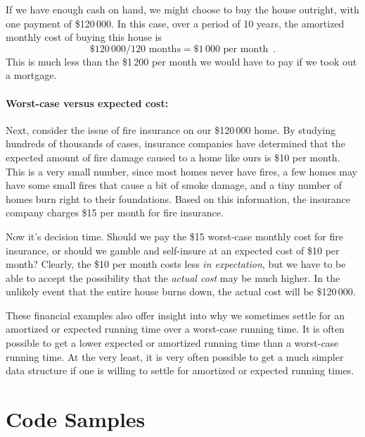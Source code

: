 If we have enough cash on hand, we might choose to buy the house outright, with one payment of \$120\,000.  In this case, over a period of 10 years, the amortized monthly cost of buying this house is \[ \$120\,000 / 120\text{ months} = \$1\,000\text{ per month} \enspace .  \] This is much less than the \$1\,200 per month we would have to pay if we took out a mortgage.

\paragraph{Worst-case versus expected cost:}
 Next, consider the issue of fire insurance on our \$120\,000 home.  By studying hundreds of thousands of cases, insurance companies have determined that the expected amount of fire damage caused to a home like ours is \$10 per month.  This is a very small number, since most homes never have fires, a few homes may have some small fires that cause a bit of smoke damage, and a tiny number of homes burn right to their foundations.  Based on this information, the insurance company charges \$15 per month for fire insurance.

Now it's decision time. Should we pay the \$15 worst-case monthly cost for fire insurance, or should we gamble and self-insure at an expected cost of \$10 per month?  Clearly, the \$10 per month costs less \emph{in expectation}, but we have to be able to accept the possibility that the \emph{actual cost} may be much higher.  In the unlikely event that the entire house burns down, the actual cost will be \$120\,000.

These financial examples also offer insight into why we sometimes settle for an amortized or expected running time over a worst-case running time.  It is often possible to get a lower expected or amortized running time than a worst-case running time. At the very least, it is very often possible to get a much simpler data structure if one is willing to settle for amortized or expected running times.

\section{Code Samples}


